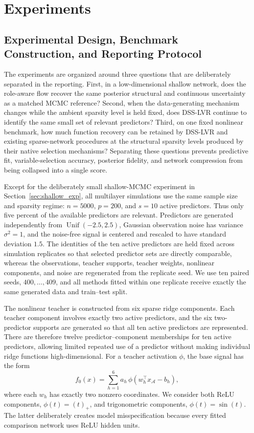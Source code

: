 \section{Experiments}
\label{sec:experiments}

\subsection{Experimental Design, Benchmark Construction, and Reporting Protocol}
\label{sec:exp_design}

The experiments are organized around three questions that are deliberately separated in the reporting. First, in a low-dimensional shallow network, does the role-aware flow recover the same posterior structural and continuous uncertainty as a matched MCMC reference? Second, when the data-generating mechanism changes while the ambient sparsity level is held fixed, does DSS-LVR continue to identify the same small set of relevant predictors? Third, on one fixed nonlinear benchmark, how much function recovery can be retained by DSS-LVR and existing sparse-network procedures at the structural sparsity levels produced by their native selection mechanisms? Separating these questions prevents predictive fit, variable-selection accuracy, posterior fidelity, and network compression from being collapsed into a single score.

Except for the deliberately small shallow-MCMC experiment in Section~\ref{sec:shallow_exp}, all multilayer simulations use the same sample size and sparsity regime: $n=5000$, $p=200$, and $s=10$ active predictors. Thus only five percent of the available predictors are relevant. Predictors are generated independently from $\operatorname{Unif}(-2.5,2.5)$, Gaussian observation noise has variance $\sigma^2=1$, and the noise-free signal is centered and rescaled to have standard deviation $1.5$. The identities of the ten active predictors are held fixed across simulation replicates so that selected predictor sets are directly comparable, whereas the observations, teacher supports, teacher weights, nonlinear components, and noise are regenerated from the replicate seed. We use ten paired seeds, $400,\ldots,409$, and all methods fitted within one replicate receive exactly the same generated data and train--test split.

The nonlinear teacher is constructed from six sparse ridge components. Each teacher component involves exactly two active predictors, and the six two-predictor supports are generated so that all ten active predictors are represented. There are therefore twelve predictor--component memberships for ten active predictors, allowing limited repeated use of a predictor without making individual ridge functions high-dimensional. For a teacher activation $\phi$, the base signal has the form
\[
    f_0(x)=\sum_{h=1}^{6} a_h\,\phi(w_h^\top x_{\mathcal A}-b_h),
\]
where each $w_h$ has exactly two nonzero coordinates. We consider both ReLU components, $\phi(t)=(t)_+$, and trigonometric components, $\phi(t)=\sin(t)$. The latter deliberately creates model misspecification because every fitted comparison network uses ReLU hidden units.

